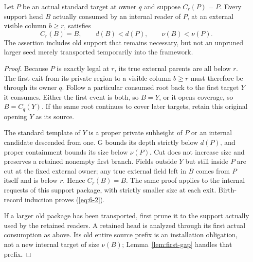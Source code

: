 \begin{lemma}\label{lem:small-support}
Let $P$ be an actual standard target at owner $q$ and suppose $C_r(P)=P$.
Every support head $B$ actually consumed by an internal reader of $P$,
at an external visible column $b\ge r$, satisfies
\begin{equation}\label{eq:6-2}
          C_r(B)=B,\qquad d(B)<d(P),\qquad\nu(B)<\nu(P).       
\end{equation}
The assertion includes old support that remains necessary, but not an
unpruned larger seed merely transported temporarily into the framework.
\end{lemma}
\begin{proof}
Because $P$ is exactly legal at $r$, its true external parents are all
below $r$. The first exit from its private region to a visible column
$b\ge r$ must therefore be through its owner $q$. Follow a particular
consumed root back to the first target $Y$ it consumes. Either the
first event is both, so $B=Y$, or it opens coverage, so $B=C_q(Y)$.
If the same root continues to cover later targets, retain this original
opening $Y$ as its source.

The standard template of $Y$ is a proper private subheight of $P$ or
an internal candidate descended from one. G bounds its depth strictly
below $d(P)$, and proper containment bounds its size below $\nu(P)$.
Cut does not increase size and preserves a retained nonempty first
branch. Fields outside $Y$ but still inside $P$ are cut at the fixed
external owner; any true external field left in $B$ comes from $P$
itself and is below $r$. Hence $C_r(B)=B$. The same proof applies to
the internal requests of this support package, with strictly smaller
size at each exit. Birth-record induction proves (\ref{eq:6-2}).

If a larger old package has been transported, first prune it to the
support actually used by the retained readers. A retained head is
analyzed through its first actual consumption as above. Its old entire
source prefix is an installation obligation, not a new internal target
of size $\nu(B)$; Lemma~\ref{lem:first-gap} handles that prefix.
\end{proof}

